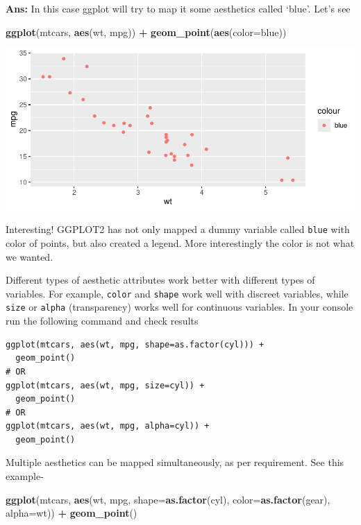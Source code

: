 \documentclass[
]{book}
\newenvironment{Shaded}{\begin{snugshade}}{\end{snugshade}}
\newcommand{\AttributeTok}[1]{\textcolor[rgb]{0.13,0.29,0.53}{#1}}
\newcommand{\FunctionTok}[1]{\textcolor[rgb]{0.13,0.29,0.53}{\textbf{#1}}}
\newcommand{\NormalTok}[1]{#1}
\newcommand{\SpecialCharTok}[1]{\textcolor[rgb]{0.81,0.36,0.00}{\textbf{#1}}}
\newcommand{\StringTok}[1]{\textcolor[rgb]{0.31,0.60,0.02}{#1}}
\begin{document}
\textbf{Ans:} In this case ggplot will try to map it some aesthetics called `blue'. Let's see

\begin{Shaded}
\begin{Highlighting}[]
\FunctionTok{ggplot}\NormalTok{(mtcars, }\FunctionTok{aes}\NormalTok{(wt, mpg)) }\SpecialCharTok{+}
  \FunctionTok{geom\_point}\NormalTok{(}\FunctionTok{aes}\NormalTok{(}\AttributeTok{color=}\StringTok{\textquotesingle{}blue\textquotesingle{}}\NormalTok{))}
\end{Highlighting}
\end{Shaded}

\begin{center}\includegraphics{DauR_files/figure-latex/fig_9-1} \end{center}

Interesting! GGPLOT2 has not only mapped a dummy variable called \texttt{\textquotesingle{}blue\textquotesingle{}} with color of points, but also created a legend. More interestingly the color is not what we wanted.

Different types of aesthetic attributes work better with different types of variables. For example, \texttt{color} and \texttt{shape} work well with discreet variables, while \texttt{size} or \texttt{alpha} (transparency) works well for continuous variables. In your console run the following command and check results

\begin{verbatim}
ggplot(mtcars, aes(wt, mpg, shape=as.factor(cyl))) +
  geom_point()
# OR
ggplot(mtcars, aes(wt, mpg, size=cyl)) +
  geom_point()
# OR
ggplot(mtcars, aes(wt, mpg, alpha=cyl)) +
  geom_point()
\end{verbatim}

Multiple aesthetics can be mapped simultaneously, as per requirement. See this example-

\begin{Shaded}
\begin{Highlighting}[]
\FunctionTok{ggplot}\NormalTok{(mtcars, }\FunctionTok{aes}\NormalTok{(wt, mpg, }\AttributeTok{shape=}\FunctionTok{as.factor}\NormalTok{(cyl), }\AttributeTok{color=}\FunctionTok{as.factor}\NormalTok{(gear), }\AttributeTok{alpha=}\NormalTok{wt)) }\SpecialCharTok{+}
  \FunctionTok{geom\_point}\NormalTok{()}
\end{Highlighting}
\end{Shaded}
\end{document}

